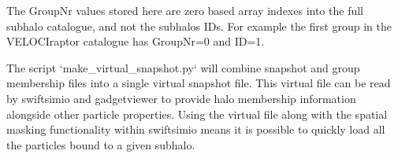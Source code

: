 \documentclass{article}
\begin{document}
The GroupNr values stored here are zero based array indexes into the
full subhalo catalogue, and not the subhalos IDs. For example the first group
in the VELOCIraptor catalogue has GroupNr=0 and ID=1.

The script `make\_virtual\_snapshot.py` will combine snapshot and group membership files
into a single virtual snapshot file. This virtual file can be read by swiftsimio and 
gadgetviewer to provide halo membership information alongside other particle properties.
Using the virtual file along with the spatial masking functionality within swiftsimio
means it is possible to quickly load all the particles bound to a given subhalo.
\end{document}
